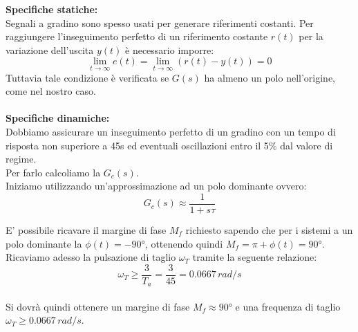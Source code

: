 \textbf{Specifiche statiche:} \\
Segnali a gradino sono spesso usati per generare riferimenti
costanti. Per raggiungere l'inseguimento perfetto di un riferimento costante $r(t)$ per la variazione dell'uscita $y(t)$ è necessario imporre:
\[\lim_{t\to\infty} e(t)= \lim_{t\to\infty} (r(t)-y(t))=0 \]
Tuttavia tale condizione è verificata se $G(s)$ ha almeno un polo nell'origine, come nel nostro caso. \\ \\
\textbf{Specifiche dinamiche:} \\
Dobbiamo assicurare un inseguimento perfetto di un gradino con un tempo di risposta non superiore a 45s ed eventuali oscillazioni entro il 5\% dal valore di regime.
\\ Per farlo calcoliamo la $G_c(s)$. \\
Iniziamo utilizzando un'approssimazione ad un polo dominante ovvero: $$G_c(s)\approx \frac{1}{1+s\tau}$$

E' possibile ricavare il margine di fase $M_f$ richiesto sapendo che per i sistemi a un polo dominante la $\phi(t)=-90°$, ottenendo quindi $M_f=\pi+\phi (t) = 90°$.
\\
Ricaviamo adesso la pulsazione di taglio $\omega_T$ tramite la seguente relazione: \\ $$\omega_T \geq \frac{3}{T_a} = \frac{3}{45} = 0.0667 \, rad/s$$ \\
Si dovrà quindi ottenere un margine di fase $M_f \approx 90°$ e una frequenza di taglio $\omega_T \geq 0.0667 \, rad/s$.
